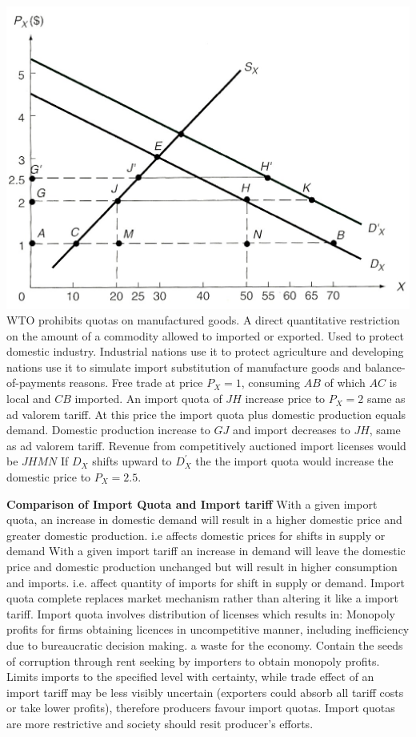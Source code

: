 \documentclass[12pt]{examnotes}
\begin{document}
\includegraphics[scale=0.3]{./imgs/91.jpg}
\ra WTO prohibits quotas on manufactured goods.
\ra A direct quantitative restriction on the amount of a commodity allowed to imported or exported.
\ra Used to protect domestic industry. Industrial nations use it to protect agriculture and developing nations use it to simulate import substitution of manufacture goods and balance-of-payments reasons.
\ra Free trade at price $P_X=1$, consuming $AB$ of which $AC$ is local and $CB$ imported.
\ra An import quota of $JH$ increase price to $P_X=2$ same as ad valorem tariff. At this price the import quota plus domestic production equals demand. Domestic production increase to $GJ$ and import decreases to $JH$, same as ad valorem tariff.
\ra Revenue from competitively auctioned import licenses would be $JHMN$
\ra If $D_X$ shifts upward to $D_X^\prime$ the the import quota would increase the domestic price to $P_X=2.5$.

{\bf Comparison of Import Quota and Import tariff}
\ra With a given import quota, an increase in domestic demand will result in a higher domestic price and greater domestic production. i.e affects domestic prices for shifts in supply or demand
\ra With a given import tariff an increase in demand will leave the domestic price and domestic production unchanged but will result in higher consumption and imports. i.e. affect quantity of imports for shift in supply or demand.
\ra Import quota complete replaces market mechanism rather than altering it like a import tariff.
\ra Import quota involves distribution of licenses which results in:
 Monopoly profits for firms obtaining licences in uncompetitive manner, including inefficiency due to bureaucratic decision making. a waste for the economy.
 Contain the seeds of corruption through rent seeking by importers to obtain monopoly profits.
 Limits imports to the specified level with certainty, while trade effect of an import tariff may be less visibly uncertain (exporters could absorb all tariff costs or take lower profits), therefore producers favour import quotas. 
\ra Import quotas are more restrictive and society should resit producer's efforts.
\end{document}
